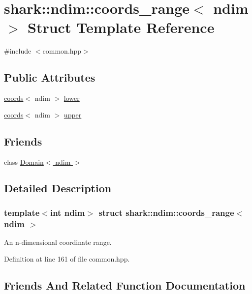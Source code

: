\hypertarget{structshark_1_1ndim_1_1coords__range}{}\section{shark\+:\+:ndim\+:\+:coords\+\_\+range$<$ ndim $>$ Struct Template Reference}
\label{structshark_1_1ndim_1_1coords__range}


{\ttfamily \#include $<$common.\+hpp$>$}

\subsection*{Public Attributes}
\begin{DoxyCompactItemize}
\item 
\hyperlink{structshark_1_1ndim_1_1coords}{coords}$<$ ndim $>$ \hyperlink{structshark_1_1ndim_1_1coords__range_a46cae2c424d7b20f911a970c92581b19}{lower}
\item 
\hyperlink{structshark_1_1ndim_1_1coords}{coords}$<$ ndim $>$ \hyperlink{structshark_1_1ndim_1_1coords__range_ae0101e4bb3ecadf1faa0fc786dfb05db}{upper}
\end{DoxyCompactItemize}
\subsection*{Friends}
\begin{DoxyCompactItemize}
\item 
class \hyperlink{structshark_1_1ndim_1_1coords__range_a483bc1f76b20142461235b510178045b}{Domain$<$ ndim $>$}
\end{DoxyCompactItemize}


\subsection{Detailed Description}
\subsubsection*{template$<$int ndim$>$\newline
struct shark\+::ndim\+::coords\+\_\+range$<$ ndim $>$}

An n-\/dimensional coordinate range. 

Definition at line 161 of file common.\+hpp.



\subsection{Friends And Related Function Documentation}
\hypertarget{structshark_1_1ndim_1_1coords__range_a483bc1f76b20142461235b510178045b}{}\label{structshark_1_1ndim_1_1coords__range_a483bc1f76b20142461235b510178045b} 
